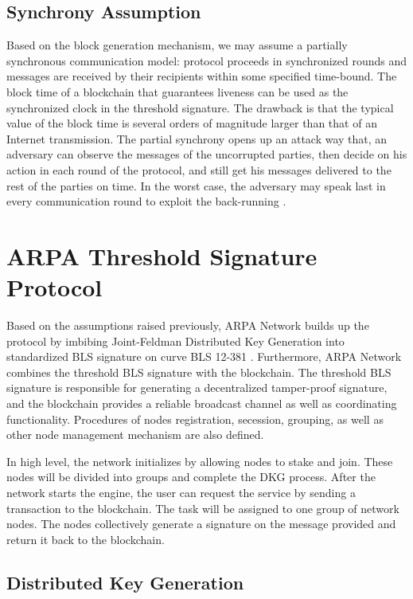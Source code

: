 \documentclass[11pt]{article}
\begin{document}
\subsection{Synchrony Assumption}

Based on the block generation mechanism, we may assume a partially synchronous communication model: protocol proceeds in synchronized rounds and messages are received by their recipients within some specified time-bound. The block time of a blockchain that guarantees liveness can be used as the synchronized clock in the threshold signature. The drawback is that the typical value of the block time is several orders of magnitude larger than that of an Internet transmission. The partial synchrony opens up an attack way that, an adversary can observe the messages of the uncorrupted parties, then decide on his action in each round of the protocol, and still get his messages delivered to the rest of the parties on time. In the worst case, the adversary may speak last in every communication round to exploit the back-running \cite{gennaro2007secure}.

\section{ARPA Threshold Signature Protocol}

Based on the assumptions raised previously, ARPA Network builds up the protocol by imbibing Joint-Feldman Distributed Key Generation into standardized BLS signature \cite{irtf-cfrg-bls-signature-05} on curve BLS 12-381 \cite{sean2017bls}. Furthermore, ARPA Network combines the threshold BLS signature with the blockchain. The threshold BLS signature is responsible for generating a decentralized tamper-proof signature, and the blockchain provides a reliable broadcast channel as well as coordinating functionality. Procedures of nodes registration, secession, grouping, as well as other node management mechanism are also defined.

In high level, the network initializes by allowing nodes to stake and join. These nodes will be divided into groups and complete the DKG process. After the network starts the engine, the user can request the service by sending a transaction to the blockchain. The task will be assigned to one group of network nodes. The nodes collectively generate a signature on the message provided and return it back to the blockchain.

\subsection{Distributed Key Generation}
\end{document}

